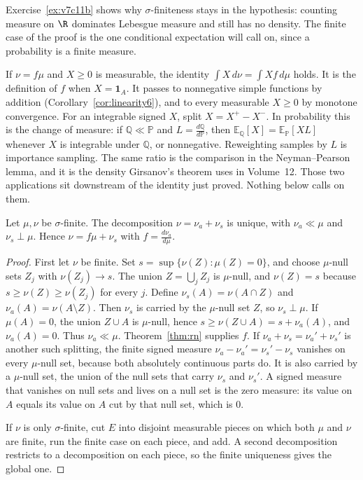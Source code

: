 Exercise~\ref{ex:v7c11b} shows why $\sigma$-finiteness stays in the hypothesis: counting measure on $\R$ dominates Lebesgue measure and still has no density. The finite case of the proof is the one conditional expectation will call on, since a probability is a finite measure.

If $\nu=f\mu$ and $X\ge0$ is measurable, the identity $\int X\,d\nu=\int Xf\,d\mu$ holds. It is the definition of $f$ when $X=\mathbf 1_A$. It passes to nonnegative simple functions by addition (Corollary~\ref{cor:linearity6}), and to every measurable $X\ge0$ by monotone convergence. For an integrable signed $X$, split $X=X^+-X^-$. In probability this is the change of measure: if $\mathbb Q\ll\mathbb P$ and $L=\frac{d\mathbb Q}{d\mathbb P}$, then $\mathbb E_{\mathbb Q}[X]=\mathbb E_{\mathbb P}[XL]$ whenever $X$ is integrable under $\mathbb Q$, or nonnegative. Reweighting samples by $L$ is importance sampling. The same ratio is the comparison in the Neyman--Pearson lemma, and it is the density Girsanov's theorem uses in Volume~12. Those two applications sit downstream of the identity just proved. Nothing below calls on them.

\begin{theorem}\label{thm:lebdecomp}
Let $\mu,\nu$ be $\sigma$-finite. The decomposition $\nu=\nu_a+\nu_s$ is unique, with $\nu_a\ll\mu$ and $\nu_s\perp\mu$. Hence $\nu=f\mu+\nu_s$ with $f=\frac{d\nu_a}{d\mu}$.
\end{theorem}
\begin{proof}
First let $\nu$ be finite. Set $s=\sup\{\nu(Z):\mu(Z)=0\}$, and choose $\mu$-null sets $Z_j$ with $\nu(Z_j)\to s$. The union $Z=\bigcup_jZ_j$ is $\mu$-null, and $\nu(Z)=s$ because $s\ge\nu(Z)\ge\nu(Z_j)$ for every $j$. Define $\nu_s(A)=\nu(A\cap Z)$ and $\nu_a(A)=\nu(A\setminus Z)$. Then $\nu_s$ is carried by the $\mu$-null set $Z$, so $\nu_s\perp\mu$. If $\mu(A)=0$, the union $Z\cup A$ is $\mu$-null, hence $s\ge\nu(Z\cup A)=s+\nu_a(A)$, and $\nu_a(A)=0$. Thus $\nu_a\ll\mu$. Theorem~\ref{thm:rn} supplies $f$. If $\nu_a+\nu_s=\nu_a'+\nu_s'$ is another such splitting, the finite signed measure $\nu_a-\nu_a'=\nu_s'-\nu_s$ vanishes on every $\mu$-null set, because both absolutely continuous parts do. It is also carried by a $\mu$-null set, the union of the null sets that carry $\nu_s$ and $\nu_s'$. A signed measure that vanishes on null sets and lives on a null set is the zero measure: its value on $A$ equals its value on $A$ cut by that null set, which is $0$.

If $\nu$ is only $\sigma$-finite, cut $E$ into disjoint measurable pieces on which both $\mu$ and $\nu$ are finite, run the finite case on each piece, and add. A second decomposition restricts to a decomposition on each piece, so the finite uniqueness gives the global one.
\end{proof}

